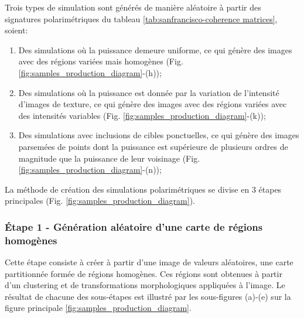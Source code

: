 Trois types de simulation sont générés de manière aléatoire à partir des signatures polarimétriques du tableau \ref{tab:sanfrancisco-coherence matrices}, soient:
\begin{enumerate}
    \item Des simulations où la puissance demeure uniforme, ce qui génère des images avec des régions variées mais homogènes (Fig. \ref{fig:samples_production_diagram}-(h));
    \item Des simulations où la puissance est donnée par la variation de l'intensité d'images de texture,  ce qui génère des images avec des régions variées avec des intensités variables (Fig. \ref{fig:samples_production_diagram}-(k));
    \item Des simulations avec inclusions de cibles ponctuelles,  ce qui génère des images parsemées de points dont la puissance est supérieure de plusieurs ordres de magnitude que la puissance de leur voisinage (Fig. \ref{fig:samples_production_diagram}-(n));
\end{enumerate}

La méthode de création des simulations polarimétriques se divise en 3 étapes principales (Fig. \ref{fig:samples_production_diagram}).




\subsubsection{Étape 1 - Génération aléatoire d'une carte de régions homogènes}

Cette étape consiste à créer à partir d'une image de valeurs aléatoires, une carte partitionnée formée de régions homogènes.  Ces régions sont obtenues à partir d'un clustering et de transformations morphologiques appliquées à l'image. Le résultat de chacune des sous-étapes est illustré par les sous-figures (a)-(e) sur la figure principale \ref{fig:samples_production_diagram}.

